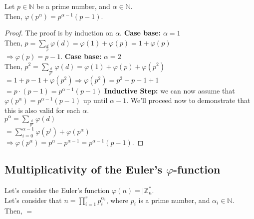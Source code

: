 \begin{lemma}
    Let $p \in \mathbb{N}$  be a prime number, and $\alpha \in \mathbb{N}$.\\
    Then, $\varphi(p^{\alpha}) = p^{\alpha - 1}(p - 1)$.\newline
\end{lemma}
\begin{proof}
    The proof is by induction on $\alpha$.\newline
    \textbf{Case base:} $\alpha = 1$\\
    Then, $p = \sum_{\frac{d}{p}} \varphi(d) = \varphi(1) + \varphi(p) = 1 + \varphi(p)$\\
    $\Rightarrow \varphi(p) = p - 1$.\newline
    \textbf{Case base:} $\alpha = 2$\\
    Then, $p^{2} = \sum_{\frac{d}{p^{2}}} \varphi(d) = \varphi(1) + \varphi(p) + \varphi(p^{2})$\\
    $= 1 + p - 1 + \varphi(p^{2}) \Rightarrow \varphi(p^{2}) = p^{2} - p - 1 + 1$\\
    $= p \cdot (p - 1) = p^{\alpha - 1}(p - 1)$\newline
    \textbf{Inductive Step:} we can now assume that $\varphi(p^{\alpha}) = p^{\alpha - 1}(p - 1)$ up until $\alpha - 1$. We'll proceed now to demonstrate that this is also valid for each $\alpha$.\\
    $p^{\alpha} = \sum_{\frac{d}{p^{\alpha}}} \varphi(d)$\\
    $= \sum_{i = 0}^{\alpha - 1} \varphi(p^{i}) + \varphi(p^{\alpha})$\\
    $\Rightarrow \varphi(p^{\alpha}) = p^{\alpha} - p^{\alpha - 1} = p^{\alpha - 1}(p - 1)$.\newline
\end{proof}

\subsection{Multiplicativity of the Euler's $\varphi$-function}
\begin{theorem}
    Let's consider the Euler's function $\varphi(n) = |\mathbb{Z}_{n}^{*}$.\\
    Let's consider that $n = \prod_{i=1}^{r} p_{i}^{\alpha_{i}}$, where $p_{i}$ is a prime number, and $\alpha_{i} \in \mathbb{N}$.\\
    Then, $=$
\end{theorem}


